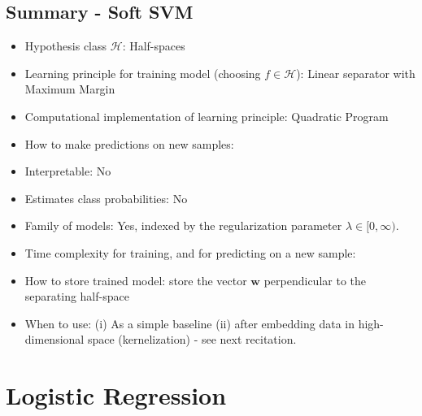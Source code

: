 \documentclass[11pt]{article}
\newcommand{\Hc}{\mathcal{H}}
\newcommand{\VV}[1]{\mathbf{#1}}
\begin{document}
\subsection{Summary - Soft SVM}
\begin{itemize}
     \item Hypothesis class $\Hc$: Half-spaces
     \item Learning principle for training model (choosing $f\in\Hc$): Linear separator with Maximum Margin
    \item Computational implementation of learning principle: Quadratic Program
  \item How to make predictions on new samples:       
  \item Interpretable: No
    \item Estimates class probabilities: No
  \item Family of models: Yes, indexed by the regularization parameter
    $\lambda\in[0,\infty)$.
     \item Time complexity for training, and for predicting on a new sample:
  \item How to store trained model: store the vector $\VV{w}$ perpendicular to
    the separating half-space  
  \item When to use: (i) As a simple baseline (ii) after embedding data in
    high-dimensional space (kernelization) - see next recitation. 
\end{itemize}


\section{Logistic Regression}
\end{document}
